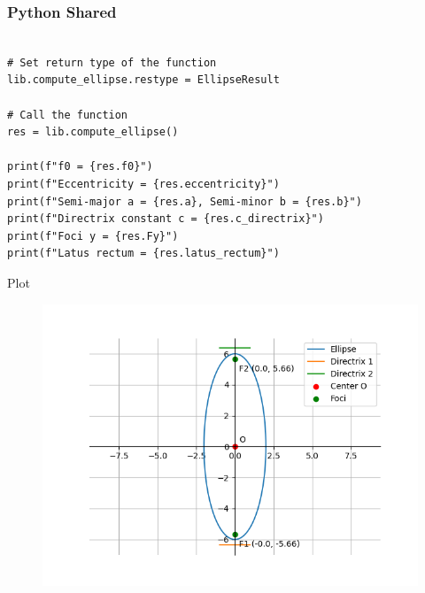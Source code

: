 \documentclass{beamer}
\begin{document}
\begin{frame}[fragile]
    \frametitle{Python Shared}
    \begin{lstlisting}

# Set return type of the function
lib.compute_ellipse.restype = EllipseResult

# Call the function
res = lib.compute_ellipse()

print(f"f0 = {res.f0}")
print(f"Eccentricity = {res.eccentricity}")
print(f"Semi-major a = {res.a}, Semi-minor b = {res.b}")
print(f"Directrix constant c = {res.c_directrix}")
print(f"Foci y = {res.Fy}")
print(f"Latus rectum = {res.latus_rectum}")

    \end{lstlisting}
\end{frame}
\begin{frame}{Plot}
    \begin{figure}
        \centering
        \includegraphics[width=0.75\linewidth]{figs/Figure_1.png}
        \caption{}
        \label{fig:placeholder}
    \end{figure}
\end{frame}
\end{document}
